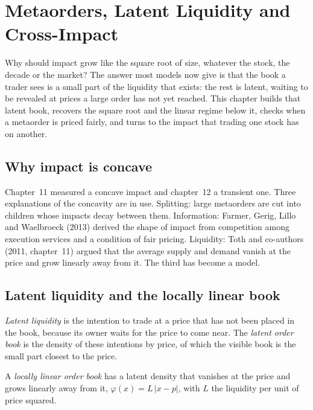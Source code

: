 \chapter{Metaorders, Latent Liquidity and Cross-Impact}\label{ch:mx:metaorders-latent-liquidity-and-cross-impact}

Why should impact grow like the square root of size, whatever the stock, the decade or the market? The answer most models now give is that the book a
trader sees is a small part of the liquidity that exists: the rest is latent, waiting to be revealed at prices a large order has not yet reached. This
chapter builds that latent book, recovers the square root and the linear regime below it, checks when a metaorder is priced fairly, and turns to the
impact that trading one stock has on another.

\section{Why impact is concave}

Chapter~11 measured a concave impact and chapter~12 a transient one. Three explanations of the concavity are in use. Splitting: large metaorders are cut
into children whose impacts decay between them. Information: Farmer, Gerig, Lillo and Waelbroeck (2013) derived the shape of impact from competition among
execution services and a condition of fair pricing. Liquidity: Toth and co-authors (2011, chapter~11) argued that the average supply and demand vanish at
the price and grow linearly away from it. The third has become a model.

\section{Latent liquidity and the locally linear book}

\begin{definition}\label{def:mx:metaorders-latent-liquidity-and-cross-impact:latent}
\emph{Latent liquidity} is the intention to trade at a price that has not been placed in the book, because its owner waits
for the price to come near. The \emph{latent order book} is the density of these intentions by price, of which the visible book
is the small part closest to the price.
\end{definition}

\begin{definition}\label{def:mx:metaorders-latent-liquidity-and-cross-impact:linear}
A \emph{locally linear order book} has a latent density that vanishes at the price and grows linearly away from it,
$\varphi(x)=L\,|x-p|$, with $L$ the liquidity per unit of price squared.
\end{definition}

